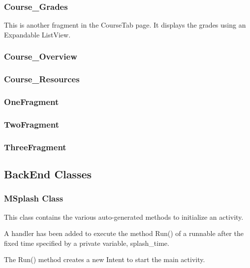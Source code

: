 \documentclass{article}
\begin{document}
\subsubsection{Course\_Grades}
\par\noindent This is another fragment in the CourseTab page. It displays the grades using an Expandable ListView.
\subsubsection{Course\_Overview}
\subsubsection{Course\_Resources}

\subsubsection{OneFragment}
\subsubsection{TwoFragment}
\subsubsection{ThreeFragment}

\subsection{BackEnd Classes}

\subsubsection{MSplash Class}
\par\noindent This class contains the various auto-generated methods to initialize an activity.
\par\noindent A handler has been added to execute the method Run() of a runnable after the fixed time specified by a private variable, splash\_time.
\par\noindent The Run() method creates a new Intent to start the main activity.

\end{document}
